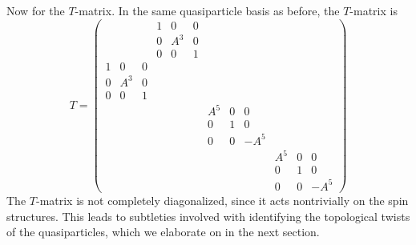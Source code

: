 \documentclass[12pt,a4paper]{article}
\newcommand\be            {\begin{equation}}
\newcommand\ee            {\end{equation}}
\begin{document}
Now for the $T$-matrix. 
In the same quasiparticle basis as before, the $T$-matrix is
\be 
T = \begin{pmatrix}   			&&&				1&0&0&		&&&			&& \\ 
					        &&&				0&A^3&0&	&&&			&&\\
					        &&& 				0&0&1&		&&&			&&\\
						1&0&0&			&&&			&&&			&& \\
						0&A^3&0&		&&&			&&&			&&\\
						0&0&1&			&&&			&&&			&&\\
						&&&				&&&			A^{5}&0&0&	&&\\
						&&&				&&&			0&1&0&		&&\\
						&&&				&&&			0&0&-A^{5}&	&&\\
						&&&				&&&			&&&			A^{5}&0&0\\
						&&&				&&&			&&&			0&1&0 \\ 
						&&&				&&&			&&&			0&0&-A^{5} \end{pmatrix}\ee	
The $T$-matrix is not completely diagonalized, since it acts nontrivially on the spin structures. 
This leads to subtleties involved with identifying the topological twists of the quasiparticles, 
which we elaborate on in the next section. 
\end{document}

